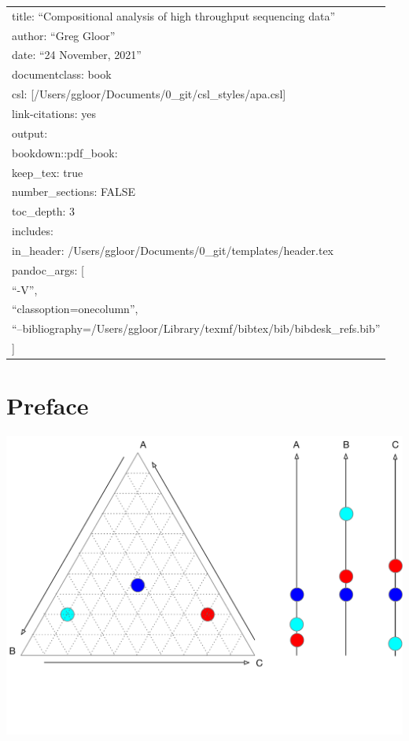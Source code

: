 \documentclass[
  onecolumn]{article}
\author{}
\date{\vspace{-2.5em}}
\begin{document}
{
\setcounter{tocdepth}{3}
\tableofcontents
}
\begin{longtable}[]{@{}l@{}}
\toprule
\endhead
title: ``Compositional analysis of high throughput sequencing data'' \\
author: ``Greg Gloor'' \\
date: ``24 November, 2021'' \\
documentclass: book \\
csl: {[}/Users/ggloor/Documents/0\_git/csl\_styles/apa.csl{]} \\
link-citations: yes \\
output: \\
bookdown::pdf\_book: \\
keep\_tex: true \\
number\_sections: FALSE \\
toc\_depth: 3 \\
includes: \\
in\_header: /Users/ggloor/Documents/0\_git/templates/header.tex \\
pandoc\_args: {[} \\
``-V'', \\
``classoption=onecolumn'', \\
``--bibliography=/Users/ggloor/Library/texmf/bibtex/bib/bibdesk\_refs.bib'' \\
{]} \\
\bottomrule
\end{longtable}

\hypertarget{preface}{%
\section*{Preface}\label{preface}}

\includegraphics{figs/simplex.pdf}
\end{document}
